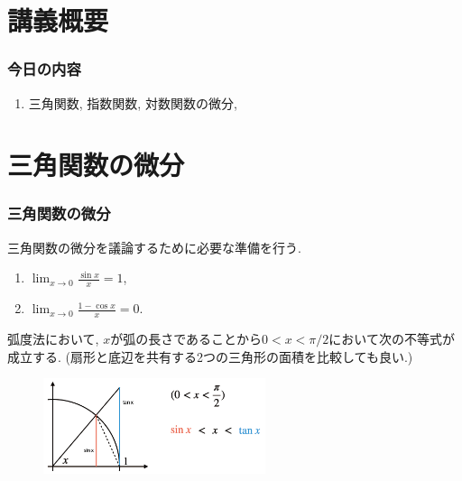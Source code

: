 \section{講義概要}


\begin{frame}
\frametitle{今日の内容}



\begin{enumerate}
\item 三角関数, 指数関数, 対数関数の微分,
\end{enumerate} 



\end{frame}






\section{三角関数の微分}

\begin{frame}
\frametitle{三角関数の微分}


\vspace{-4mm}

三角関数の微分を議論するために必要な準備を行う. 

\vspace{-1mm}

\begin{Thm} \label{準備}
\begin{enumerate}
\item $\displaystyle\lim_{x \to 0} \frac{\sin x}{x}=1$, 
\item  $\displaystyle \lim_{x \to 0} \frac{1-\cos x}{x}=0$. 
\end{enumerate}
\end{Thm}
弧度法において, $x$が弧の長さであることから$0<x<\pi/2$において次の不等式が成立する. 
(扇形と底辺を共有する2つの三角形の面積を比較しても良い.)
\vspace{-6mm}

 \begin{figure}[htbp]
 \begin{center} 
  \includegraphics[width=65mm]{calculus5/sintan.png}
 \end{center}
\end{figure}

\vspace{-10mm}

\end{frame}





